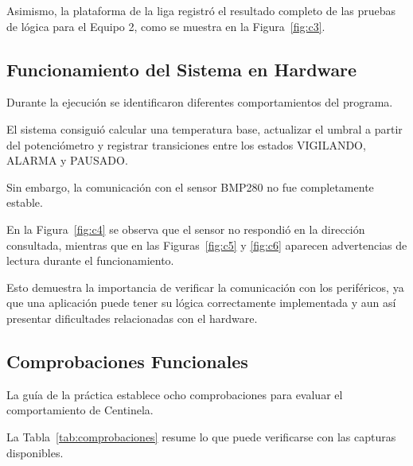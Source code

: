 \documentclass[conference]{IEEEtran}
\begin{document}
Asimismo, la plataforma de la liga registró el resultado completo de las pruebas de lógica para el Equipo 2, como se muestra en la Figura~\ref{fig:c3}.

\subsection{Funcionamiento del Sistema en Hardware}

Durante la ejecución se identificaron diferentes comportamientos del programa.

El sistema consiguió calcular una temperatura base, actualizar el umbral a partir del potenciómetro y registrar transiciones entre los estados VIGILANDO, ALARMA y PAUSADO.

Sin embargo, la comunicación con el sensor BMP280 no fue completamente estable.

En la Figura~\ref{fig:c4} se observa que el sensor no respondió en la dirección consultada, mientras que en las Figuras~\ref{fig:c5} y \ref{fig:c6} aparecen advertencias de lectura durante el funcionamiento.

Esto demuestra la importancia de verificar la comunicación con los periféricos, ya que una aplicación puede tener su lógica correctamente implementada y aun así presentar dificultades relacionadas con el hardware.

\subsection{Comprobaciones Funcionales}

La guía de la práctica establece ocho comprobaciones para evaluar el comportamiento de Centinela.

La Tabla~\ref{tab:comprobaciones} resume lo que puede verificarse con las capturas disponibles.
\end{document}

